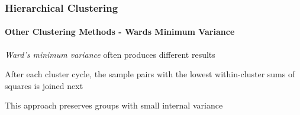 \documentclass[10pt]{beamer}
\begin{document}
\begin{frame}
\frametitle{Hierarchical Clustering}
\framesubtitle{Other Clustering Methods - Wards Minimum Variance}

\bi
\item {\em Ward's minimum variance} often produces different results

\item After each cluster cycle, the sample pairs with the lowest
  within-cluster sums of squares is joined next

\item This approach preserves groups with small internal variance
\ei

\begin{center}
\end{center}

\end{frame}
\end{document}
